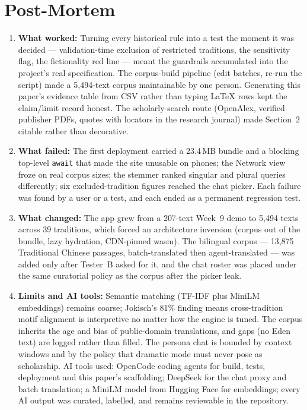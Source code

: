 \documentclass[12pt,a4paper]{article}
\begin{document}
\section{Post-Mortem}

\begin{enumerate}
  \item \textbf{What worked:} Turning every historical rule into a test the
  moment it was decided --- validation-time exclusion of restricted
  traditions, the sensitivity flag, the fictionality red line --- meant the
  guardrails accumulated into the project's real specification. The
  corpus-build pipeline (edit batches, re-run the script) made a 5{,}494-text
  corpus maintainable by one person. Generating this paper's evidence table
  from CSV rather than typing LaTeX rows kept the claim/limit record honest.
  The scholarly-search route (OpenAlex, verified publisher PDFs, quotes with
  locators in the research journal) made Section~2 citable rather than
  decorative.
  \item \textbf{What failed:} The first deployment carried a 23.4\,MB bundle
  and a blocking top-level \texttt{await} that made the site unusable on
  phones; the Network view froze on real corpus sizes; the stemmer ranked
  singular and plural queries differently; six excluded-tradition figures
  reached the chat picker. Each failure was found by a user or a test, and
  each ended as a permanent regression test.
  \item \textbf{What changed:} The app grew from a 207-text Week~9 demo to
  5{,}494 texts across 39 traditions, which forced an architecture inversion
  (corpus out of the bundle, lazy hydration, CDN-pinned wasm). The bilingual
  corpus --- 13{,}875 Traditional Chinese passages, batch-translated then
  agent-translated --- was added only after Tester~B asked for it, and the
  chat roster was placed under the same curatorial policy as the corpus
  after the picker leak.
  \item \textbf{Limits and AI tools:} Semantic matching (TF-IDF plus MiniLM
  embeddings) remains coarse; Jokisch's 81\% finding means cross-tradition
  motif alignment is interpretive no matter how the engine is tuned. The
  corpus inherits the age and bias of public-domain translations, and gaps
  (no Eden text) are logged rather than filled. The persona chat is bounded
  by context windows and by the policy that dramatic mode must never pose as
  scholarship. AI tools used: OpenCode coding agents for build, tests,
  deployment and this paper's scaffolding; DeepSeek for the chat proxy and
  batch translation; a MiniLM model from Hugging Face for embeddings; every
  AI output was curated, labelled, and remains reviewable in the repository.
\end{enumerate}

\singlespacing
\printbibliography[title={Bibliography}]
\end{document}
